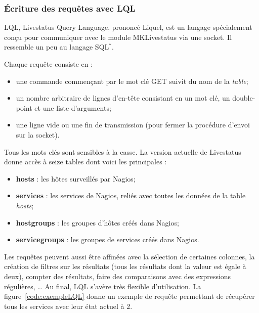 \subsubsection{\'Ecriture des requ\^etes avec LQL}

LQL, Livestatus Query Language, prononc\'e \og Liquel\fg, est un langage sp\'ecialement con\c{c}u pour communiquer avec le module MKLivestatus via une socket.
Il ressemble un peu au langage SQL$^*$.

\noindent Chaque requ\^ete consiste en :

\begin{itemize}
	\item une commande commen\c{c}ant par le mot cl\'e \textsf{GET} suivit du nom de la \textit{table};
	\item un nombre arbitraire de lignes d'en-t\^ete consistant en un mot cl\'e, un double-point et une liste d'arguments;
	\item une ligne vide ou une fin de transmission (pour fermer la proc\'edure d'envoi sur la socket).

\end{itemize}

\vspace{0.20cm}

Tous les mots cl\'es sont sensibles \`a la casse. 
La version actuelle de Livestatus donne acc\`es \`a seize tables dont voici les principales :

\begin{itemize}
	\item \textbf{hosts} : les h\^otes surveill\'es par Nagios;
	\item \textbf{services} : les services de Nagios, reli\'es avec toutes les donn\'ees de la table \textit{hosts};
	\item \textbf{hostgroups} : les groupes d'h\^otes cr\'e\'es dans Nagios;
	\item \textbf{servicegroups} : les groupes de services cr\'e\'es dans Nagios.

\end{itemize}

\vspace{0.20cm}

Les requ\^etes peuvent aussi \^etre affin\'ees avec la s\'election de certaines colonnes, la cr\'eation de filtres sur les r\'esultats (tous les r\'esultats dont la valeur est \'egale \`a deux), compter des r\'esultats, faire des comparaisons avec des expressions r\'eguli\`eres, \ldots{}
Au final, LQL s'av\`ere tr\`es flexible d'utilisation.
La figure~\ref{code:exempleLQL} donne un exemple de requ\^ete permettant de r\'ecup\'erer tous les services avec leur \'etat actuel \`a 2.

